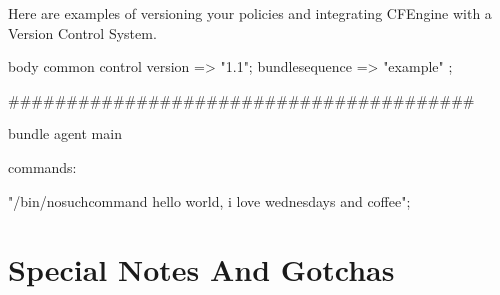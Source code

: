 Here are examples of versioning your policies and integrating CFEngine with a Version Control System.

\begin{codelisting}
\begin{code}
body common control
{
        version => "1.1";
        bundlesequence => { "example" };
}


########################################


bundle agent main
{

  commands:

      "/bin/nosuchcommand hello world, i love wednesdays and coffee";
}
\end{code}
\end{codelisting}





\section{Special Notes And Gotchas}

